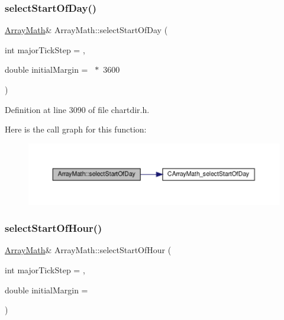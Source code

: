 \subsubsection{\texorpdfstring{select\+Start\+Of\+Day()}{selectStartOfDay()}}
{\footnotesize\ttfamily \hyperlink{class_array_math}{Array\+Math}\& Array\+Math\+::select\+Start\+Of\+Day (\begin{DoxyParamCaption}\item[{int}]{major\+Tick\+Step = {},  }\item[{double}]{initial\+Margin = {~$\ast$~3600} }\end{DoxyParamCaption})\hspace{0.3cm}{\ttfamily [inline]}}



Definition at line 3090 of file chartdir.\+h.

Here is the call graph for this function\+:
\nopagebreak
\begin{figure}[H]
\begin{center}
\leavevmode
\includegraphics[width=350pt]{class_array_math_a5e6c8318cbc69a3bb9da3c1c0ca86c26_cgraph}
\end{center}
\end{figure}
\mbox{\label{class_array_math_a39fc6c03bb738f82e4f98daebb672dda}} 
\subsubsection{\texorpdfstring{select\+Start\+Of\+Hour()}{selectStartOfHour()}}
{\footnotesize\ttfamily \hyperlink{class_array_math}{Array\+Math}\& Array\+Math\+::select\+Start\+Of\+Hour (\begin{DoxyParamCaption}\item[{int}]{major\+Tick\+Step = {},  }\item[{double}]{initial\+Margin = {} }\end{DoxyParamCaption})\hspace{0.3cm}{\ttfamily [inline]}}



